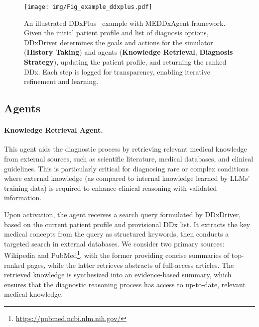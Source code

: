 \begin{figure*}[t]
	\centering
    \texttt{[image: img/Fig\_example\_ddxplus.pdf]}
    \caption{An illustrated DDxPlus~\citep{fansi2022ddxplus} example with MEDDxAgent framework. Given the initial patient profile and list of diagnosis options, DDxDriver determines the goals and actions for the simulator (\textcolor{yellow-history}{\textbf{History Taking}}) and agents (\textcolor{blue-retrieval}{\textbf{Knowledge Retrieval}}, \textcolor{green-diagnosis}{\textbf{Diagnosis Strategy}}), updating the patient profile, and returning the ranked DDx. Each step is logged for transparency, enabling iterative refinement and learning.} 
    \vspace{-1.5em}
    \label{fig:Example}
\end{figure*}
\subsection{Agents}
\label{subsec:diagnostic_agents}


\paragraph{Knowledge Retrieval Agent.}
This agent aids the diagnostic process by retrieving relevant medical knowledge from external sources, such as scientific literature, medical databases, and clinical guidelines. This is particularly critical for diagnosing rare or complex conditions where external knowledge (as compared to internal knowledge learned by LLMs' training data) is required to enhance clinical reasoning with validated information.

Upon activation, the agent receives a search query formulated by DDxDriver, based on the current patient profile and provisional DDx list. It extracts the key medical concepts from the query as structured keywords, then conducts a targeted search in external databases. We consider two primary sources: Wikipedia and PubMed\footnote{\url{https://pubmed.ncbi.nlm.nih.gov/}}, with the former providing concise summaries of top-ranked pages, while the latter retrieves abstracts of full-access articles. The retrieved knowledge is synthesized into an evidence-based summary, which ensures that the diagnostic reasoning process has access to up-to-date, relevant medical knowledge.


